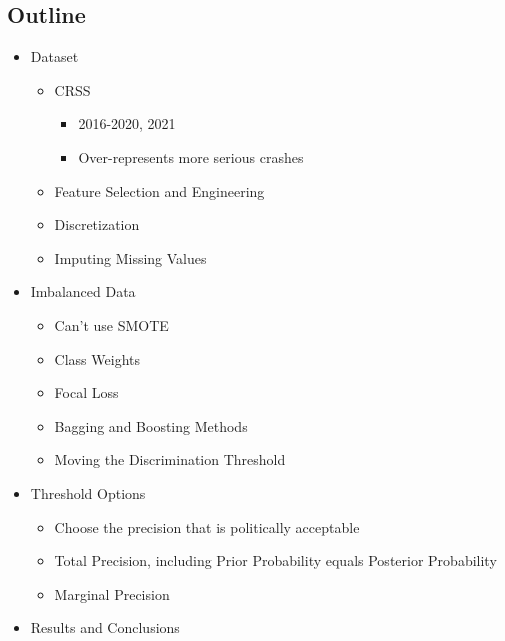 
\subsection{Outline}

\begin{itemize}

	\item Dataset
	\begin{itemize}
		\item CRSS
		\begin{itemize}
			\item 2016-2020, 2021
			\item Over-represents more serious crashes
		\end{itemize}
		\item Feature Selection and Engineering
		\item Discretization
		\item Imputing Missing Values
	\end{itemize}
	
	\item Imbalanced Data
	\begin{itemize}
		\item Can't use SMOTE
		\item Class Weights
		\item Focal Loss
		\item Bagging and Boosting Methods
		\item Moving the Discrimination Threshold
	\end{itemize}
	
	\item Threshold Options
	\begin{itemize}
		\item Choose the precision that is politically acceptable
		\item Total Precision, including Prior Probability equals Posterior Probability
		\item Marginal Precision
	\end{itemize}
	
	\item Results and Conclusions
	
\end{itemize}
